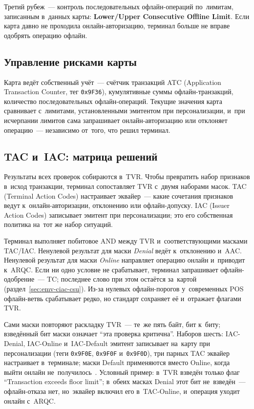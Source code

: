 Третий рубеж~--- контроль последовательных офлайн-операций по~лимитам,
записанным в~данных карты: \textbf{Lower\slash Upper Consecutive Offline Limit}.
Если карта давно не проходила онлайн-авторизацию, терминал больше не вправе
одобрять операцию офлайн.

\subsection*{Управление рисками карты}

Карта ведёт собственный учёт~--- счётчик транзакций ATC (Application
Transaction Counter, тег \texttt{0x9F36}), кумулятивные суммы
офлайн-транзакций, количество последовательных офлайн-операций. Текущие
значения карта сравнивает с~лимитами, установленными эмитентом при
персонализации, и~при исчерпании лимитов сама запрашивает онлайн-авторизацию или
отклоняет операцию~--- независимо от~того, что решил терминал.

\subsection*{TAC и~IAC: матрица решений}

Результаты всех проверок собираются в~TVR. Чтобы превратить набор признаков в~исход
транзакции, терминал сопоставляет TVR с~двумя наборами масок. TAC (Terminal
Action Codes) настраивает эквайер~--- какие сочетания признаков ведут
к~онлайн-авторизации, отклонению или офлайн-допуску. IAC (Issuer Action Codes)
записывает эмитент при персонализации; это его собственная политика на~тот же
набор ситуаций.

Терминал выполняет побитовое AND между TVR и~соответствующими масками TAC/IAC.
Ненулевой результат для маски \textit{Denial} ведёт к~отклонению и~AAC.
Ненулевой результат для маски \textit{Online} направляет операцию онлайн
и~приводит к~ARQC. Если ни одно условие не срабатывает, терминал запрашивает
офлайн-одобрение~--- TC; последнее слово при этом остаётся за~картой
(раздел~\ref{sec:emv-ciac-csu}). Из-за нулевых офлайн-порогов у~современных POS
офлайн-ветвь срабатывает редко, но стандарт сохраняет её и~отражает флагами
TVR.

Сами маски повторяют раскладку TVR~--- те~же пять байт, бит к~биту; взведённый
бит маски означает \enquote{эта проверка критична}. Наборов шесть: IAC-Denial,
IAC-Online и~IAC-Default эмитент записывает на~карту при персонализации (теги
\texttt{0x9F0E}, \texttt{0x9F0F} и~\texttt{0x9F0D}), три парных TAC эквайер
настраивает в~терминале; маски Default применяются вместо Online, когда выйти
онлайн не~получилось~\cite{emvco-book3}. Условный пример: в~TVR взведён только
флаг \enquote{Transaction exceeds floor limit}; в~обеих масках Denial этот бит
не~взведён~--- офлайн-отказа нет, но~эквайер включил его в~TAC-Online, и~операция
уходит онлайн с~ARQC.

